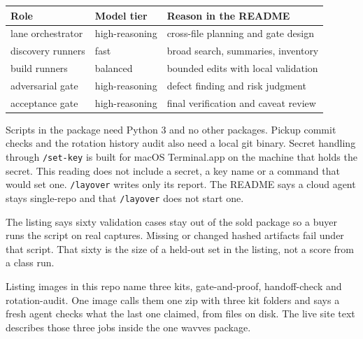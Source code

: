 \documentclass[10pt]{article}
\newcommand{\sect}[1]{%
  \par\addvspace{0.75em}%
  \noindent{\normalsize\bfseries #1}\par\nopagebreak
  \addvspace{0.2em}%
  \noindent\ignorespaces
}
\begin{document}
\begin{center}
\small
\begin{tabular}{@{}lll@{}}
\hline
\rowcolor{tabhead}
Role & Model tier & Reason in the README \\
\hline
lane orchestrator & high-reasoning & cross-file planning and gate design \\
discovery runners & fast & broad search, summaries, inventory \\
build runners & balanced & bounded edits with local validation \\
adversarial gate & high-reasoning & defect finding and risk judgment \\
acceptance gate & high-reasoning & final verification and caveat review \\
\hline
\end{tabular}
\end{center}

\sect{Limits the sources name}

Scripts in the package need Python 3 and no other packages. Pickup commit checks and the rotation history audit also need a local git binary. Secret handling through \texttt{/set-key} is built for macOS Terminal.app on the machine that holds the secret. This reading does not include a secret, a key name or a command that would set one. \texttt{/layover} writes only its report. The README says a cloud agent stays single-repo and that \texttt{/layover} does not start one.

The listing says sixty validation cases stay out of the sold package so a buyer runs the script on real captures. Missing or changed hashed artifacts fail under that script. That sixty is the size of a held-out set in the listing, not a score from a class run.

Listing images in this repo name three kits, gate-and-proof, handoff-check and rotation-audit. One image calls them one zip with three kit folders and says a fresh agent checks what the last one claimed, from files on disk. The live site text describes those three jobs inside the one wavves package.
\end{document}
